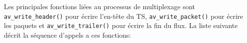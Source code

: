 \documentclass[12pt,a4paper]{article}
\begin{document}
Les principales fonctions liées au processus de multiplexage sont \texttt{av\hspace{0.1mm}\hspace{0.1mm}\_\hspace{0.1mm}\hspace{0.1mm}write\hspace{0.1mm}\hspace{0.1mm}\_\hspace{0.1mm}\hspace{0.1mm}header()} pour écrire l'en-tête du TS, \texttt{av\hspace{0.1mm}\hspace{0.1mm}\_\hspace{0.1mm}\hspace{0.1mm}write\hspace{0.1mm}\hspace{0.1mm}\_\hspace{0.1mm}\hspace{0.1mm}packet()} pour écrire les paquets et \texttt{av\hspace{0.1mm}\hspace{0.1mm}\_\hspace{0.1mm}\hspace{0.1mm}write\hspace{0.1mm}\hspace{0.1mm}\_\hspace{0.1mm}\hspace{0.1mm}trailer()} pour écrire la fin du flux. La liste suivante décrit la séquence d'appels a ces fonctions:
\end{document}
